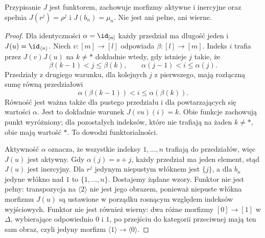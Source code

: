 \begin{stwierdzenie}\label{cat:prop:infty-delta-finpointed}
Przypisanie $J$ jest funktorem, zachowuje morfizmy aktywne i inercyjne oraz spełnia $J(r^j)=\rho^j$ i $J(b_n)=\mu_n$. Nie jest ani pełne, ani wierne.
\end{stwierdzenie}
\begin{proof}
Dla identyczności $\alpha=\id_{[n]}$ każdy przedział ma długość jeden i $J(u)=\id_{\langle n\rangle}$. Niech $v:[m]\to[l]$ odpowiada $\beta:[l]\to[m]$. Indeks $i$ trafia przez $J(v)J(u)$ na $k\neq *$ dokładnie wtedy, gdy istnieje $j$ takie, że
\[
 \beta(k-1)<j\leq\beta(k),
 \qquad \alpha(j-1)<i\leq\alpha(j).
\]
Przedziały z drugiego warunku, dla kolejnych $j$ z pierwszego, mają rozłączną sumę równą przedziałowi
\[
 \alpha(\beta(k-1))<i\leq\alpha(\beta(k)).
\]
Równość jest ważna także dla pustego przedziału i dla powtarzających się wartości $\alpha$. Jest to dokładnie warunek $J(vu)(i)=k$. Obie funkcje zachowują punkt wyróżniony; dla pozostałych indeksów, które nie trafiają na żaden $k\neq *$, obie mają wartość $*$. To dowodzi funktorialności.

Aktywność $\alpha$ oznacza, że wszystkie indeksy $1,\ldots,n$ trafiają do przedziałów, więc $J(u)$ jest aktywny. Gdy $\alpha(j)=s+j$, każdy przedział ma jeden element, stąd $J(u)$ jest inercyjny. Dla $r^j$ jedynym niepustym włóknem jest $\{j\}$, a dla $b_n$ jedyne włókno nad $1$ to $\{1,\ldots,n\}$. Dostajemy żądane wzory. Funktor nie jest pełny: transpozycja na $\langle2\rangle$ nie jest jego obrazem, ponieważ niepuste włókna morfizmu $J(u)$ są ustawione w porządku rosnącym względem indeksów wyjściowych. Funktor nie jest również wierny: dwa różne morfizmy $[0]\to[1]$ w $\Delta$, wybierające odpowiednio $0$ i $1$, po przejściu do kategorii przeciwnej mają ten sam obraz, czyli jedyny morfizm $\langle1\rangle\to\langle0\rangle$.
\end{proof}

